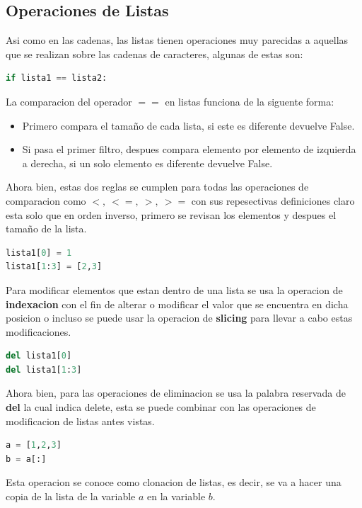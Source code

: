 \documentclass{article}
\begin{document}
\subsection{Operaciones de Listas}
Asi como en las cadenas, las listas tienen operaciones muy parecidas a aquellas que se realizan sobre las cadenas de caracteres, algunas de estas son:
\begin{lstlisting}[language=Python, caption= Comparacion de Listas]
if lista1 == lista2:
\end{lstlisting}
La comparacion del operador \( == \) en listas funciona de la siguente forma:
\begin{itemize}
    \item Primero compara el tamaño de cada lista, si este es diferente devuelve False.
    \item Si pasa el primer filtro, despues compara elemento por elemento de izquierda a derecha, si un solo elemento es diferente devuelve False.
\end{itemize}
Ahora bien, estas dos reglas se cumplen para todas las operaciones de comparacion como \( < ,\ <= ,\ > ,\ >=\) con sus repesectivas definiciones claro esta solo que en orden inverso, primero se revisan los elementos y despues el tamaño de la lista.\\
\begin{lstlisting}[language=Python, caption= Modificaciones en Listas]
lista1[0] = 1
lista1[1:3] = [2,3]
\end{lstlisting}
Para modificar elementos que estan dentro de una lista se usa la operacion de \textbf{indexacion} con el fin de alterar o modificar el valor que se encuentra en dicha posicion o incluso se puede usar la operacion de \textbf{slicing} para llevar a cabo estas modificaciones.
\begin{lstlisting}[language=Python, caption= Eliminacion de elementos de Listas]
del lista1[0]
del lista1[1:3]
\end{lstlisting}
Ahora bien, para las operaciones de eliminacion se usa la palabra reservada de \textbf{del} la cual indica delete, esta se puede combinar con las operaciones de modificacion de listas antes vistas.\\
\begin{lstlisting}[language=Python, caption= Clonacion de Listas]
a = [1,2,3]
b = a[:]
\end{lstlisting}
Esta operacion se conoce como clonacion de listas, es decir, se va a hacer una copia de la lista de la variable \(a\) en la variable \(b\). 
\end{document}
